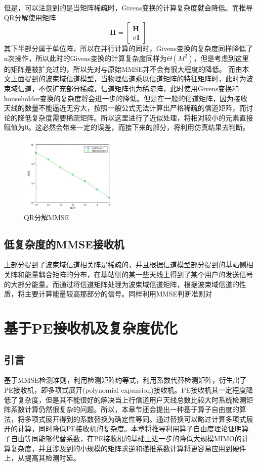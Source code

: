 \documentclass[bachelor,nocolorlinks, printoneside]{seuthesis} %
\begin{document}
\begin{Main}
但是，可以注意到的是当矩阵稀疏时，Givens变换的计算复杂度就会降低。而推导QR分解使用矩阵
\begin{equation}\label{key}
\overline{\mathbf{H}} = \left[
\begin{array}{c}
\mathbf{H}\\
\sigma \mathbf{I}
\end{array} \right]
\end{equation}
其下半部分属于单位阵，所以在并行计算的同时，Givens变换的复杂度同样降低了n次操作，所以此时的Givens变换的计算复杂度同样为$\Theta(M^2)$，但是考虑到这里的矩阵是被扩充过的，所以先对与原始MMSE并不会有很大程度的降低。
而由本文上面提到的波束域信道模型，当物理信道乘以信道矩阵的特征矩阵时，此时为波束域信道，不仅扩充部分稀疏，信道矩阵也为稀疏阵，此时使用Givens变换和householder变换的复杂度将会进一步的降低。但是在一般的信道矩阵，因为接收天线的数量不能逼近无穷大，按照一般公式无法计算出严格稀疏的信道矩阵，而讨论的降低复杂度需要稀疏矩阵。所以这里进行了近似处理，将相对较小的元素直接赋值为0。这必然会带来一定的误差，而接下来的部分，将利用仿真结果去判断。
\begin{figure}[htbp!]
	\centering \includegraphics[width=0.45\textwidth]{img/3_9.jpg} \caption{QR分解MMSE}
\end{figure}
\section{低复杂度的MMSE接收机}
上部分提到了波束域信道相关阵是稀疏的，并且根据信道模型部分提到的基站侧相关阵和能量耦合矩阵的分布，在基站侧的某一些天线上得到了某个用户的发送信号的大部分能量。而通过将信道矩阵处理为波束域信道矩阵，根据波束域信道的性质，将主要计算能量较高那部分的信号。同样利用MMSE判断准则对



\chapter{基于PE接收机及复杂度优化}
\section{引言}
基于MMSE检测准则，利用检测矩阵约等式，利用系数代替检测矩阵，衍生出了PE接收机，即多项式展开(polynomial expansion)接收机。PE接收机其一定程度降低了复杂度，但是其不能很好的解决当上行信道用户天线总数比较大时系统检测矩阵系数计算仍然很复杂的问题。所以，本章节还会提出一种基于算子自由度的算法，将多项式展开得到的系数替换为确定性等同。通过替换可以略过计算多项式展开的计算，同时降低PE接收机的复杂度。本章将推导利用算子自由度理论证明算子自由等同能够代替系数，在PE接收机的基础上进一步的降低大规模MIMO的计算复杂度，并且涉及到的小规模的矩阵求逆和递推系数计算将更容易应用到硬件上，从提高其检测时延。

\end{Main}
\end{document}
